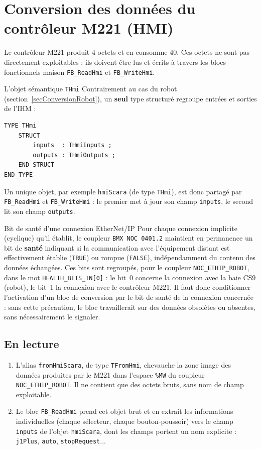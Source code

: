 \section{Conversion des données du contrôleur M221 (HMI)}
\label{secConversionHmi}

Le contrôleur M221 produit 4 octets et en consomme 40. Ces octets ne sont pas directement exploitables :
ils doivent être lus et écrits à travers les blocs fonctionnels maison
\texttt{FB\_ReadHmi} et \texttt{FB\_WriteHmi}.

\begin{UPSTIinfor}{L'objet sémantique \texttt{THmi}}
Contrairement au cas du robot (section~\ref{secConversionRobot}), un
\textbf{seul} type structuré regroupe entrées et sorties de l'IHM :
\begin{lstlisting}
TYPE THmi
    STRUCT
        inputs  : THmiInputs ;
        outputs : THmiOutputs ;
    END_STRUCT
END_TYPE
\end{lstlisting}
Un unique objet, par exemple \texttt{hmiScara} (de type \texttt{THmi}),
est donc partagé par \texttt{FB\_ReadHmi} et \texttt{FB\_WriteHmi} : le
premier met à jour son champ \texttt{inputs}, le second lit son champ
\texttt{outputs}.
\end{UPSTIinfor}

\begin{UPSTIinfor}{Bit de santé d'une connexion EtherNet/IP}
Pour chaque connexion implicite (cyclique) qu'il établit, le coupleur
\texttt{BMX~NOC~0401.2} maintient en permanence un bit de \textbf{santé}
indiquant si la communication avec l'équipement distant est effectivement
établie (\texttt{TRUE}) ou rompue (\texttt{FALSE}), indépendamment du
contenu des données échangées. Ces bits sont regroupés, pour le coupleur
\texttt{NOC\_ETHIP\_ROBOT}, dans le mot \texttt{HEALTH\_BITS\_IN[0]} :
le bit~0 concerne la connexion avec la baie CS9 (robot), le bit~1 la
connexion avec le contrôleur M221. Il faut donc conditionner
l'activation d'un bloc de conversion par le bit de santé de la connexion
concernée : sans cette précaution, le bloc travaillerait sur des données
obsolètes ou absentes, sans nécessairement le signaler.
\end{UPSTIinfor}

\subsection{En lecture}

\begin{enumerate}
    \item L'alias \texttt{fromHmiScara}, de type \texttt{TFromHmi},
    chevauche la zone image des données produites par le M221 dans
    l'espace \texttt{\%MW} du coupleur \texttt{NOC\_ETHIP\_ROBOT}. Il ne
    contient que des octets bruts, sans nom de champ exploitable.
    \item Le bloc \texttt{FB\_ReadHmi} prend cet objet brut et en extrait
    les informations individuelles (chaque sélecteur, chaque
    bouton-poussoir) vers le champ \texttt{inputs} de l'objet
    \texttt{hmiScara}, dont les champs portent un nom explicite :
    \texttt{j1Plus}, \texttt{auto}, \texttt{stopRequest}...
\end{enumerate}

